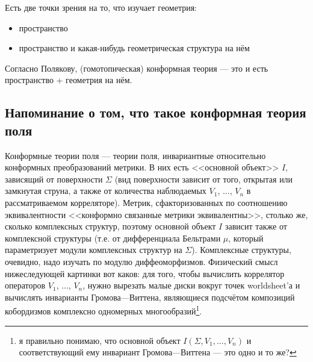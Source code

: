\documentclass[11pt]{article}
\theoremstyle{remark}
\theoremstyle{definition}
\newcommand{\que}[1]{\footnote{\textcolor[rgb]{0.38,0.69,0.82}{#1}}}
\begin{document}
Есть две точки зрения на то, что изучает геометрия:

\begin{itemize}
  \item пространство
  \item пространство и какая-нибудь геометрическая структура на нём
\end{itemize}

Согласно Полякову, (гомотопическая) конформная теория --- это и есть пространство + геометрия на нём.

\subsection{Напоминание о том, что такое конформная теория поля}

Конформные теории поля --- теории поля, инвариантные относительно конформных преобразований метрики. В них есть <<основной объект>> $I$, зависящий от поверхности $\Sigma$ (вид поверхности зависит от того, открытая или замкнутая струна, а также от количества наблюдаемых $V_1$, ..., $V_n$ в рассматриваемом корреляторе). Метрик, сфакторизованных по соотношению эквивалентности <<конформно связанные метрики эквивалентны>>, столько же, сколько комплексных структур, поэтому основной объект $I$ зависит также от комплексной структуры (т.е. от дифференциала Бельтрами $\mu$, который параметризует модули комплексных структур на $\Sigma$). Комплексные структуры, очевидно, надо изучать по модулю диффеоморфизмов. Физический смысл нижеследующей картинки вот каков: для того, чтобы вычислить коррелятор операторов $V_1$, ..., $V_n$, нужно вырезать малые диски вокруг точек worldsheet'а и вычислять инварианты Громова---Виттена, являющиеся подсчётом композиций кобордизмов комплексно одномерных многообразий\que{я правильно понимаю, что основной объект $I(\Sigma, V_1, ..., V_n)$ и соответствующий ему инвариант Громова---Виттена --- это одно и то же?}.
\end{document}
